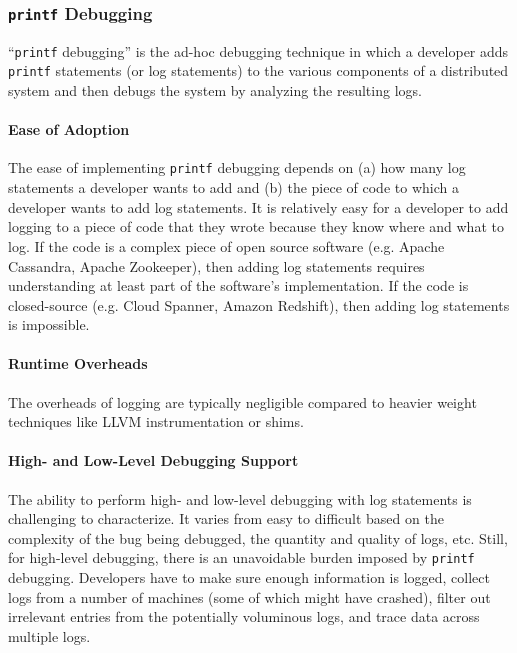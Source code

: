 \newcommand{\printf}{\texttt{printf}}
\subsubsection{\printf{} Debugging}
``\printf{} debugging'' is the ad-hoc debugging technique in which a developer
adds \printf{} statements (or log statements) to the various components of a
distributed system and then debugs the system by analyzing the resulting logs.

\paragraph{Ease of Adoption}
The ease of implementing \printf{} debugging depends on (a) how many log
statements a developer wants to add and (b) the piece of code to which a
developer wants to add log statements. It is relatively easy for a developer to
add logging to a piece of code that they wrote because they know where and what
to log. If the code is a complex piece of open source software (e.g. Apache
Cassandra, Apache Zookeeper), then adding log statements requires understanding
at least part of the software's implementation. If the code is closed-source
(e.g. Cloud Spanner, Amazon Redshift), then adding log statements is
impossible.

\paragraph{Runtime Overheads}
The overheads of logging are typically negligible compared to heavier weight
techniques like LLVM instrumentation or \fluent{} shims.

\paragraph{High- and Low-Level Debugging Support}
The ability to perform high- and low-level debugging with log statements is
challenging to characterize. It varies from easy to difficult based on the
complexity of the bug being debugged, the quantity and quality of logs, etc.
Still, for high-level debugging, there is an unavoidable burden imposed by
\printf{} debugging. Developers have to make sure enough information is logged,
collect logs from a number of machines (some of which might have crashed),
filter out irrelevant entries from the potentially voluminous logs, and trace
data across multiple logs.

\subsubsection{\fluent{}}
